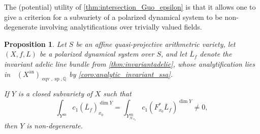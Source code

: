 \documentclass[11pt,reqno]{amsart}
\newcommand{\mZ}{\mathbb{Z}}
\newcommand{\mR}{\mathbb{R}}
\newcommand{\mQ}{\mathbb{Q}}
\newcommand{\cC}{\mathcal{C}}
\newcommand{\sH}{{\mathscr H}}
\newcommand{\sM}{{\mathscr M}}
\theoremstyle{theorem}
\numberwithin{equation}{subsection}
\newtheorem{prop}[subsubsection]{Proposition}
\newtheorem{conjecture}[subsubsection]{Conjecture}
\numberwithin{equation}{subsection}
\theoremstyle{definition}
\newtheorem{remark}[subsubsection]{Remark}
\theoremstyle{remark}
\numberwithin{equation}{subsubsection} \numberwithin{figure}{section}
\DeclareMathOperator{\an}{an}
\DeclareMathOperator{\acPic}{\widehat{\underline{Pic}}}
\DeclareMathOperator{\semip}{sp}
\DeclareMathOperator{\eqv}{eqv}
\begin{document}
%
%
%
%

The (potential) utility of \autoref{thm:intersection_Guo_epsilon} is that it allows one to give a criterion for a subvariety of a polarized dynamical system to be non-degenerate involving analytifications over trivially valued fields.



\begin{prop}\label{prop:nondegenerate_trivially}
Let $S$ be an affine quasi-projective arithmetric variety, let $(X,f,L)$ be a polarized dynamical system over $S$, and let $\overline{L}_f$ denote the invariant adelic line bundle from \autoref{thm:invariantadelic}, whose analytification lies in $\acPic(X^{\an})_{\eqv,\semip,\mQ}$ by \autoref{coro:analytic_invariant_ssa}. 

If $Y$ is a closed subvariety of $X$ such that 
\[
\int_{Y^{\an}} c_1(\overline{L}_{f})_{x_0}^{\dim Y} = \int_{Y_{\sH_{x_{0}}}^{\an}} c_1(F_{x_0}^*\overline{L}_{f})^{\dim Y}\neq 0,
\]
then $Y$ is non-degenerate. 
\end{prop}
\end{document}
